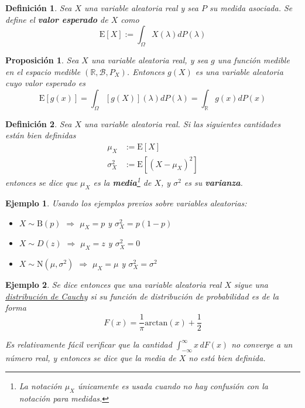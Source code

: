 \documentclass[12pt,letterpaper]{book}
\newtheorem{definicion}{Definición}[chapter]
\newtheorem{proposicion}[teorema]{Proposición}
\newtheorem{ejemplo}{Ejemplo}[chapter]
\newcommand{\R}{\mathbb{R}}
\newcommand{\intR}{\int_{-\infty}^{\infty}}
\newcommand{\E}[1]{\mathrm{E}\left[ #1 \right]}
\begin{document}
\begin{definicion}
Sea $X$ una variable aleatoria real y sea $P$ su medida asociada. Se define el \textbf{valor esperado} de $X$ como
\begin{equation}
\E{X} := \int_\Omega X(\lambda) dP(\lambda)
\end{equation}
\end{definicion}

\begin{proposicion}
Sea $X$ una variable aleatoria real, y sea $g$ una función medible en el espacio medible $(\R,\mathcal{B},P_X)$. Entonces $g(X)$ es una variable aleatoria cuyo valor esperado es
\begin{equation}
\E{g(x)} = \int_\Omega [g(X)](\lambda) dP(\lambda) = \int_\R g(x) dP(x)
\end{equation}
\end{proposicion}

\begin{definicion}
Sea $X$ una variable aleatoria real. Si las siguientes cantidades están bien definidas
\begin{align}
\mu_X &{:=} \E{X} \\
\sigma_X^{2} &{:=} \E{(X-\mu_X)^{2}}
\end{align}
entonces se dice que $\mu_X$ es la \textbf{media}\footnote{La notación $\mu_X$ únicamente es usada cuando no hay confusión con la notación para medidas.} de $X$, y $\sigma^2$ es su \textbf{varianza}.
\end{definicion}

\begin{ejemplo}
Usando los ejemplos previos sobre variables aleatorias:
\begin{itemize}
\item $X\sim \text{B}(p)$ $\Rightarrow$ $\mu_X = p$ y $\sigma^2_X = p(1-p)$
\item $X\sim D(z)$ $\Rightarrow$ $\mu_X = z$ y $\sigma^2_X = 0$
\item $X\sim \text{N}(\mu,\sigma^{2})$ $\Rightarrow$ $\mu_X = \mu$ y $\sigma^2_X = \sigma^2$
\end{itemize}
\end{ejemplo}

\begin{ejemplo}
Se dice entonces que una variable aleatoria real $X$ sigue una \ul{distribuci\'on de Cauchy} si su función de distribución de probabilidad es de la forma
\begin{equation}
F(x) = \frac{1}{\pi} \mathrm{arc tan}\left( x \right) + \frac{1}{2}
\end{equation}

Es relativamente fácil verificar que la cantidad $\intR x\, dF(x)$ no converge a un número real, y entonces se dice que la media de $X$ no está \textit{bien definida}.
\end{ejemplo}
\end{document}
